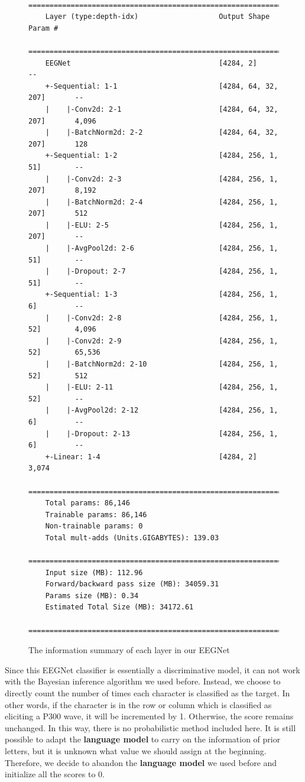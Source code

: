 \documentclass{article}
\begin{document}
\begin{figure}[H]
\scriptsize
\centering
\begin{BVerbatim}
	==========================================================================================
	Layer (type:depth-idx)                   Output Shape              Param #
	==========================================================================================
	EEGNet                                   [4284, 2]                 --
	+-Sequential: 1-1                        [4284, 64, 32, 207]       --
	|    |-Conv2d: 2-1                       [4284, 64, 32, 207]       4,096
	|    |-BatchNorm2d: 2-2                  [4284, 64, 32, 207]       128
	+-Sequential: 1-2                        [4284, 256, 1, 51]        --
	|    |-Conv2d: 2-3                       [4284, 256, 1, 207]       8,192
	|    |-BatchNorm2d: 2-4                  [4284, 256, 1, 207]       512
	|    |-ELU: 2-5                          [4284, 256, 1, 207]       --
	|    |-AvgPool2d: 2-6                    [4284, 256, 1, 51]        --
	|    |-Dropout: 2-7                      [4284, 256, 1, 51]        --
	+-Sequential: 1-3                        [4284, 256, 1, 6]         --
	|    |-Conv2d: 2-8                       [4284, 256, 1, 52]        4,096
	|    |-Conv2d: 2-9                       [4284, 256, 1, 52]        65,536
	|    |-BatchNorm2d: 2-10                 [4284, 256, 1, 52]        512
	|    |-ELU: 2-11                         [4284, 256, 1, 52]        --
	|    |-AvgPool2d: 2-12                   [4284, 256, 1, 6]         --
	|    |-Dropout: 2-13                     [4284, 256, 1, 6]         --
	+-Linear: 1-4                            [4284, 2]                 3,074
	==========================================================================================
	Total params: 86,146
	Trainable params: 86,146
	Non-trainable params: 0
	Total mult-adds (Units.GIGABYTES): 139.03
	==========================================================================================
	Input size (MB): 112.96
	Forward/backward pass size (MB): 34059.31
	Params size (MB): 0.34
	Estimated Total Size (MB): 34172.61
	==========================================================================================
\end{BVerbatim}
\caption{The information summary of each layer in our EEGNet}
\label{fig:6}
\end{figure}

\vspace{-3mm}
Since this EEGNet classifier is essentially a discriminative model, it can not work with the Bayesian inference algorithm we used before. Instead, we choose to directly count the number of times each character is classified as the target. In other words, if the character is in the row or column which is classified as eliciting a P300 wave, it will be incremented by 1. Otherwise, the score remains unchanged. In this way, there is no probabilistic method included here. It is still possible to adapt the \textbf{language model} to carry on the information of prior letters, but it is unknown what value we should assign at the beginning. Therefore, we decide to abandon the \textbf{language model} we used before and initialize all the scores to $0$.
\end{document}
